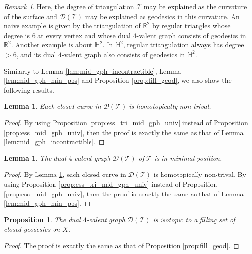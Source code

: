\documentclass[UTF8]{amsart}
\newtheorem{lemma}[theorem]{Lemma}
\newtheorem{proposition}[theorem]{Proposition}
\numberwithin{equation}{section}
\theoremstyle{definition}
\theoremstyle{example}
\theoremstyle{remark}
\newtheorem*{remark}{Remark}
\begin{document}
\begin{remark}
Here, the degree of triangulation $\mathcal{T}$ may be explained as the curvature of the surface and $\mathcal{D}(\mathcal{T})$ may be explained as geodesics in this curvature. An naive example is given by the triangulation of $\mathbb{R}^2$ by regular triangles whose degree is $6$ at every vertex and whose dual $4$-valent graph consists of geodesics in $\mathbb{R}^2$. Another example is about $\mathbb{H}^2$. In $\mathbb{H}^2$, regular triangulation always has degree $>6$, and its dual $4$-valent graph also consists of geodesics in $\mathbb{H}^2$. 
\end{remark}


Similarly to Lemma \ref{lem:mid_gph_incontractible}, Lemma \ref{lem:mid_gph_min_pos} and Proposition \ref{prop:fill_geod}, we also show the following results.

\begin{lemma}
	Each closed curve in $\mathcal{D}(\mathcal{T})$ is homotopically non-trival. 
	\label{lem:mid_gph_incontractible_tri}
\end{lemma}
\begin{proof}
By using Proposition \ref{prop:ess_tri_mid_gph_univ} instead of Proposition \ref{prop:ess_mid_gph_univ}, then the proof is exactly the same as that of Lemma \ref{lem:mid_gph_incontractible}.
\end{proof}

\begin{lemma}
The dual $4$-valent graph $\mathcal{D}(\mathcal{T})$ of $\mathcal{T}$ is in minimal position. 
	\label{lem:mid_gph_min_pos_tri}
\end{lemma}
\begin{proof}
	By Lemma \ref{lem:mid_gph_incontractible_tri}, each closed curve in $\mathcal{D}(\mathcal{T})$ is homotopically non-trival. By using Proposition \ref{prop:ess_tri_mid_gph_univ} instead of Proposition \ref{prop:ess_mid_gph_univ}, then the proof is exactly the same as that of Lemma \ref{lem:mid_gph_min_pos}.
\end{proof}

\begin{proposition}
The dual $4$-valent graph $\mathcal{D}(\mathcal{T})$ is isotopic to a filling set of closed geodesics on $X$. 
	\label{prop:fill_geod_tri}
\end{proposition}
\begin{proof}
The proof is exactly the same as that of Proposition \ref{prop:fill_geod}.
\end{proof}
\end{document}
